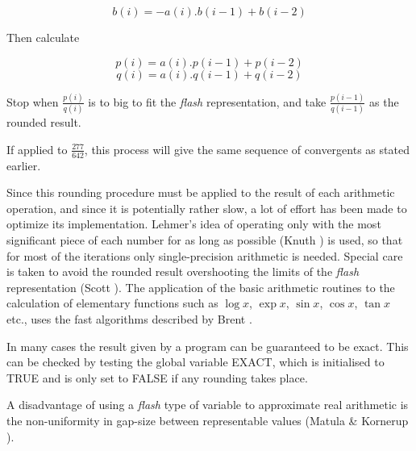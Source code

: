                 $$   b(i) = -a(i).b(i-1) + b(i-2)     $$

      Then calculate

                $$   p(i) = a(i).p(i-1) + p(i-2)   $$
                $$   q(i) = a(i).q(i-1) + q(i-2)   $$

      Stop when $\frac{p(i)}{q(i)}$ is to big to fit the  {\em flash}   representation, 
      and take $\frac{p(i-1)}{q(i-1)}$ as the rounded result.  
        
      If applied to $\frac{277}{642}$, this process will give the same sequence of 
      convergents as stated earlier.  

      Since  this  rounding procedure must be applied to the result of each 
      arithmetic operation, and since it is potentially rather slow,  a lot 
      of effort has been made to optimize its implementation. Lehmer's idea 
      of  operating only with the most significant piece of each number for 
      as long as possible (Knuth \cite{Knuth81}) is used,  so that for  most  of  the 
      iterations  only single-precision arithmetic is needed.  Special care 
      is taken to avoid the rounded result overshooting the limits  of  the 
      {\em flash}  representation  (Scott \cite{Scott89a}).  The application of the basic 
      arithmetic routines to the calculation of elementary  functions  such 
      as $\log x$, $\exp x$, $\sin x$, $\cos x$, $\tan x$ etc., uses the fast
      algorithms described by Brent \cite{Brent76}.

      In  many  cases the result given by a program can be guaranteed to be 
      exact.  This can be checked by testing  the  global  variable  EXACT, 
      which  is  initialised  to  TRUE and is only set to FALSE if any rounding 
      takes place.  

      A  disadvantage  of  using  a {\em flash} type of variable to approximate 
      real  arithmetic  is   the   non-uniformity   in   gap-size   between 
      representable  values  (Matula  \& Kornerup \cite{Matula85}).  

